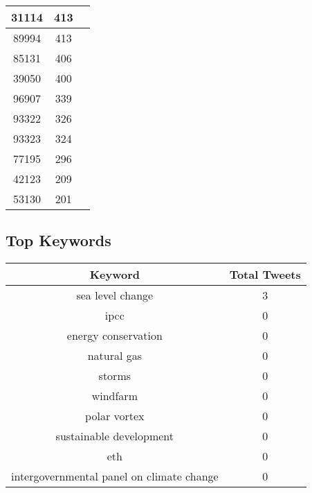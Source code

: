 \documentclass{article}\usepackage[T1]{fontenc}
\begin{document}
\begin{tabular}{|c|c|c|}
 \hline
31114 & 413\\ 
 \hline
89994 & 413\\ 
 \hline
85131 & 406\\ 
 \hline
39050 & 400\\ 
 \hline
96907 & 339\\ 
 \hline
93322 & 326\\ 
 \hline
93323 & 324\\ 
 \hline
77195 & 296\\ 
 \hline
42123 & 209\\ 
 \hline
53130 & 201\\ 
 \hline
\end{tabular}\subsection*{Top Keywords}\begin{tabular}{|c|c|}         \hline         Keyword & Total Tweets \\ 
 \hline
sea level change & 3\\ 
 \hline
ipcc & 0\\ 
 \hline
energy conservation & 0\\ 
 \hline
natural gas & 0\\ 
 \hline
storms & 0\\ 
 \hline
windfarm & 0\\ 
 \hline
polar vortex & 0\\ 
 \hline
sustainable development & 0\\ 
 \hline
eth & 0\\ 
 \hline
intergovernmental panel on climate change & 0\\ 
 \hline
\end{tabular}
\end{document}
